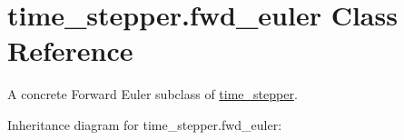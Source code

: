 \hypertarget{classtime__stepper_1_1fwd__euler}{}\section{time\+\_\+stepper.\+fwd\+\_\+euler Class Reference}
\label{classtime__stepper_1_1fwd__euler}


A concrete Forward Euler subclass of \hyperlink{classtime__stepper_1_1time__stepper}{time\+\_\+stepper}.  




Inheritance diagram for time\+\_\+stepper.\+fwd\+\_\+euler\+:
